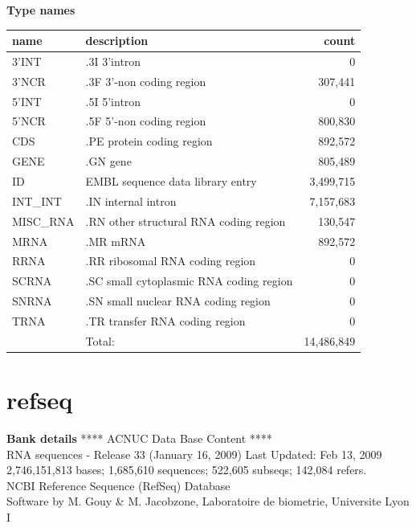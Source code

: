 \documentclass{article}
\begin{document}
\begin{Schunk}
\textbf{Type names}
\noindent\begin{tabular}{llr}
\hline \hline
name & description & count \\
\hline
3'INT  &  .3I 3'intron  &  0 \\
3'NCR  &  .3F  3'-non coding region  &  307,441 \\
5'INT  &  .5I 5'intron  &  0 \\
5'NCR  &  .5F  5'-non coding region  &  800,830 \\
CDS  &  .PE protein coding region  &  892,572 \\
GENE  &  .GN gene  &  805,489 \\
ID  &  EMBL sequence data library entry  &  3,499,715 \\
INT\_INT  &  .IN  internal intron  &  7,157,683 \\
MISC\_RNA  &  .RN other structural RNA coding region  &  130,547 \\
MRNA  &  .MR mRNA  &  892,572 \\
RRNA  &  .RR ribosomal RNA coding region  &  0 \\
SCRNA  &  .SC small cytoplasmic RNA coding region  &  0 \\
SNRNA  &  .SN small nuclear RNA coding region  &  0 \\
TRNA  &  .TR transfer RNA coding region  &  0 \\
\hline
 & Total: & 14,486,849 \\
\hline \hline
\end{tabular}

\section{ refseq }
\textbf{Bank details}
             ****     ACNUC Data Base Content      ****    \\
    RNA sequences - Release 33 (January 16, 2009) Last Updated: Feb 13, 2009\\
2,746,151,813 bases; 1,685,610 sequences; 522,605 subseqs; 142,084 refers.\\
 		NCBI Reference Sequence (RefSeq) Database\\
Software by M. Gouy \& M. Jacobzone, Laboratoire de biometrie, Universite Lyon I 


\end{Schunk}
\end{document}
